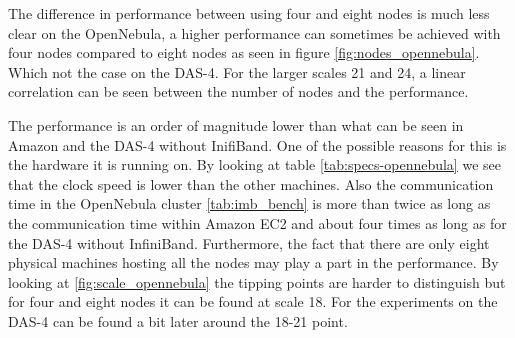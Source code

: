 The difference in performance between using four and eight nodes is much less clear on the OpenNebula, a higher performance can sometimes be achieved with four nodes compared to eight nodes as seen in figure \ref{fig:nodes_opennebula}. Which not the case on the DAS-4.
For the larger scales 21 and 24, a linear correlation can be seen between the number of nodes and the performance.

The performance is an order of magnitude lower than what can be seen in Amazon and the DAS-4 without InifiBand. One of the possible reasons for this is the hardware it is running on. By looking at table \ref{tab:specs-opennebula} we see that the clock speed is lower than the other machines. Also the communication time in the OpenNebula cluster \ref{tab:imb_bench} is more than twice as long as the communication time within Amazon EC2 and about four times as long as for the DAS-4 without InfiniBand. Furthermore, the fact that there are only eight physical machines hosting all the nodes may play a part in the performance. By looking at \ref{fig:scale_opennebula} the tipping points are harder to distinguish but for four and eight nodes it can be found at scale 18. For the experiments on the DAS-4 can be found a bit later around the 18-21 point.

